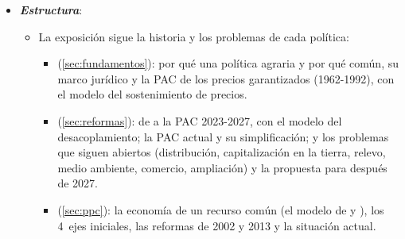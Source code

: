 \documentclass[11pt]{article}
\begin{document}
\begin{itemize}
\item \textbf{\emph{Estructura}}:
  \begin{itemize}
  \item La exposición sigue la historia y los problemas de cada política:
    \begin{itemize}
    \item {} (\ref{sec:fundamentos}): por qué una política agraria y por qué común, su marco jurídico y la PAC de los precios garantizados (1962-1992), con el modelo del sostenimiento de precios.
    \item {} (\ref{sec:reformas}): de  a la PAC 2023-2027, con el modelo del desacoplamiento; la PAC actual y su simplificación; y los problemas que siguen abiertos (distribución, capitalización en la tierra, relevo, medio ambiente, comercio, ampliación) y la propuesta para después de 2027.
    \item {} (\ref{sec:ppc}): la economía de un recurso común (el modelo de  y ), los 4~ejes iniciales, las reformas de 2002 y 2013 y la situación actual.
    \end{itemize}
  \end{itemize}
\end{itemize}
\end{document}
